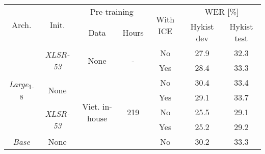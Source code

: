 

\begin{table}[!ht]
\captionsetup{font=Large}
\centering
\begin{adjustbox}{width=0.7\columnwidth,center}
\begin{tabular}{|c|c|c|c|c|c|c|} 
\hline
\multirow{2}{*}{Arch.}             & \multirow{2}{*}{Init.}             & \multicolumn{2}{c|}{Pre-training}                            & \multirow{2}{*}{With ICE} & \multicolumn{2}{c|}{WER [\%]}  \\ 
\cline{3-4}\cline{6-7}
                                   &                                    & Data                                 & Hours                 &                           & Hykist dev & Hykist test       \\ 
\hline
\multirow{6}{*}{\textit{Large}\textsubscript{1-8}} & \multirow{2}{*}{\textit{XLSR-53}}  & \multirow{2}{*}{None}                & \multirow{2}{*}{-}    & No                        & 27.9       & 32.3              \\ 
\cline{5-7}
                                   &                                    &                                      &                       & Yes                       & 28.4       & 33.3              \\ 
\cline{2-7}
                                   & \multirow{2}{*}{None}              & \multirow{6}{*}{Viet. in-house}      & \multirow{6}{*}{219}  & No                        & 30.4       & 33.4              \\ 
\cline{5-7}
                                   &                                    &                                      &                       & Yes                       & 29.1       & 33.7              \\ 
\cline{2-2}\cline{5-7}
                                   & \multirow{2}{*}{\textit{XLSR-53 }} &                                      &                       & No                        & 25.5       & 29.1              \\ 
\cline{5-7}
                                   &                                    &                                      &                       & Yes                       & 25.2       & 29.2              \\ 
\cline{1-2}\cline{5-7}
\multirow{2}{*}{\textit{Base}}     & \multirow{4}{*}{None}              &                                      &                       & No                        & 30.2       & 33.3              \\ 

\end{tabular}
\end{adjustbox}
\end{table}
